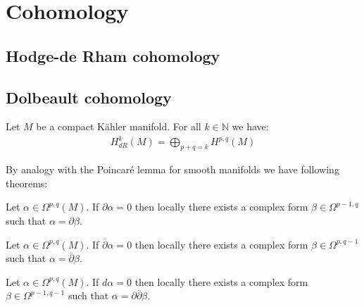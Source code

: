 \section{Cohomology}
\subsection{Hodge-de Rham cohomology}


\subsection{Dolbeault cohomology}

	\begin{theorem}
		Let $M$ be a compact K\"ahler manifold. For all $k\in\mathbb{N}$ we have:
		\begin{gather}
			H^k_{dR}(M) = \bigoplus_{p+q=k}H^{p, q}(M)
		\end{gather}
	\end{theorem}

	By analogy with the Poincar\'e lemma for smooth manifolds we have following theorems:
	\begin{theorem}
		Let $\alpha\in\Omega^{p, q}(M)$. If $\partial\alpha = 0$ then locally there exists a complex form $\beta\in\Omega^{p-1, q}$ such that $\alpha = \partial\beta$.
	\end{theorem}
	\begin{theorem}
		Let $\alpha\in\Omega^{p, q}(M)$. If $\overline{\partial}\alpha = 0$ then locally there exists a complex form $\beta\in\Omega^{p, q-1}$ such that $\alpha = \overline{\partial}\beta$.
	\end{theorem}
	\begin{theorem}\label{complex:del_delbar_lemma}
		Let $\alpha\in\Omega^{p, q}(M)$. If $d\alpha = 0$ then locally there exists a complex form $\beta\in\Omega^{p-1, q-1}$ such that $\alpha = \partial\overline{\partial}\beta$.
	\end{theorem}
